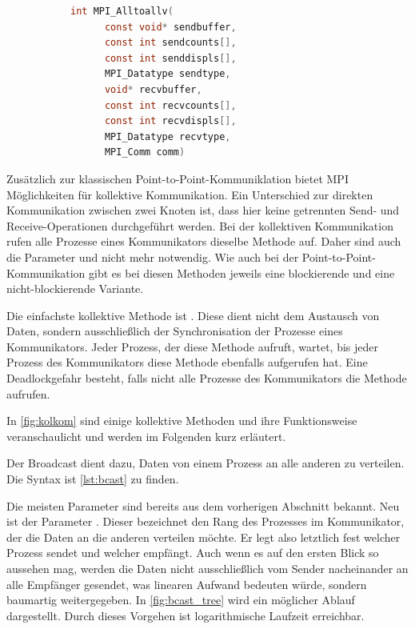       \begin{figure}[t]
      \begin{subfigure}{0.9\textwidth}
      \begin{lstlisting}[language=C, label=lst:a2a, caption={Die Syntax von \code{MPI\_Alltoallv}}, numbers=none]
	int MPI_Alltoallv(
	  const void* sendbuffer,
	  const int sendcounts[], 
	  const int senddispls[], 
	  MPI_Datatype sendtype, 
	  void* recvbuffer, 
	  const int recvcounts[], 
	  const int recvdispls[], 
	  MPI_Datatype recvtype, 
	  MPI_Comm comm)
      \end{lstlisting}
      \end{subfigure}
      \end{figure}
      Zusätzlich zur klassischen Point-to-Point-Kommuniklation bietet MPI Möglichkeiten für kollektive Kommunikation. Ein Unterschied zur direkten Kommunikation zwischen zwei Knoten ist, dass hier
      keine getrennten Send- und Receive-Operationen durchgeführt werden. Bei der kollektiven Kommunikation rufen alle Prozesse eines Kommunikators dieselbe Methode auf. Daher sind auch die Parameter
       und  nicht mehr notwendig. Wie auch bei der Point-to-Point-Kommunikation gibt es bei diesen Methoden jeweils eine blockierende und eine nicht-blockierende Variante.
      
      Die einfachste kollektive Methode ist . Diese dient nicht dem Austausch von Daten, sondern ausschließlich der  Synchronisation der Prozesse eines Kommunikators.
      Jeder Prozess, der diese Methode aufruft, wartet, bis jeder Prozess des Kommunikators diese Methode ebenfalls aufgerufen hat. Eine Deadlockgefahr besteht, falls nicht alle Prozesse
      des Kommunikators die Methode aufrufen. \citep{mpiv31}
      
      In \autoref{fig:kolkom} sind einige kollektive Methoden und ihre Funktionsweise veranschaulicht und werden im Folgenden kurz erläutert.
      
      Der Broadcast dient dazu, Daten von einem Prozess an alle anderen zu verteilen. Die Syntax ist \autoref{lst:bcast} zu finden.

      Die meisten Parameter sind bereits aus dem vorherigen Abschnitt bekannt. Neu ist der Parameter . Dieser bezeichnet den Rang des Prozesses im Kommunikator,
      der die Daten an die anderen verteilen möchte. Er legt also letztlich fest welcher Prozess sendet und welcher empfängt.
      Auch wenn es auf den ersten Blick so aussehen mag, werden die Daten nicht ausschließlich vom Sender nacheinander an alle Empfänger gesendet, was linearen Aufwand
      bedeuten würde, sondern baumartig weitergegeben. In \autoref{fig:bcast_tree} wird ein möglicher Ablauf dargestellt. Durch dieses Vorgehen ist logarithmische Laufzeit erreichbar. 
      \citep{mpitut, mpiv31}
      
